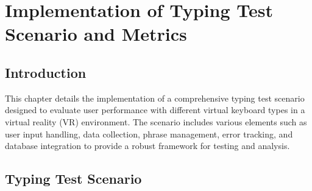 \chapter{Implementation of Typing Test Scenario and Metrics}

\section{Introduction}
This chapter details the implementation of a comprehensive typing test scenario designed to evaluate user performance with different virtual keyboard types in a virtual reality (VR) environment. The scenario includes various elements such as user input handling, data collection, phrase management, error tracking, and database integration to provide a robust framework for testing and analysis.

\section{Typing Test Scenario}

